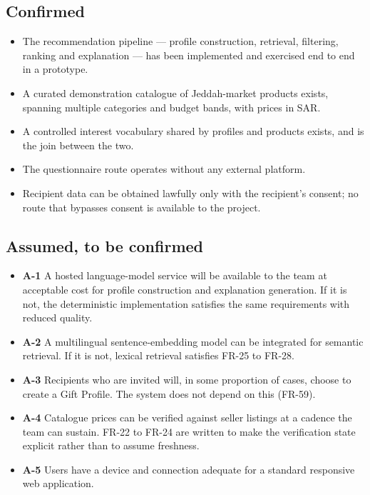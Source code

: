 \documentclass[11pt,a4paper]{report}
\begin{document}
\subsection*{Confirmed}
\begin{itemize}
  \item The recommendation pipeline --- profile construction, retrieval, filtering, ranking
        and explanation --- has been implemented and exercised end to end in a prototype.
  \item A curated demonstration catalogue of Jeddah-market products exists, spanning multiple
        categories and budget bands, with prices in SAR.
  \item A controlled interest vocabulary shared by profiles and products exists, and is the
        join between the two.
  \item The questionnaire route operates without any external platform.
  \item Recipient data can be obtained lawfully only with the recipient's consent; no route
        that bypasses consent is available to the project.
\end{itemize}

\subsection*{Assumed, to be confirmed}
\begin{itemize}
  \item \textbf{A-1} A hosted language-model service will be available to the team at
        acceptable cost for profile construction and explanation generation. If it is not,
        the deterministic implementation satisfies the same requirements with reduced
        quality.
  \item \textbf{A-2} A multilingual sentence-embedding model can be integrated for semantic
        retrieval. If it is not, lexical retrieval satisfies FR-25 to FR-28.
  \item \textbf{A-3} Recipients who are invited will, in some proportion of cases, choose to
        create a Gift Profile. The system does not depend on this (FR-59).
  \item \textbf{A-4} Catalogue prices can be verified against seller listings at a cadence
        the team can sustain. FR-22 to FR-24 are written to make the verification state
        explicit rather than to assume freshness.
  \item \textbf{A-5} Users have a device and connection adequate for a standard responsive
        web application.
\end{itemize}
\end{document}
